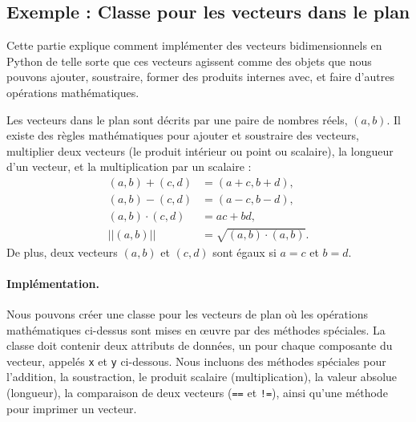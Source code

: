 \documentclass[%
oneside,                 %
final,                   %
10pt]{article}
\begin{document}
\noindent
\subsection{Exemple : Classe pour les vecteurs dans le plan}
Cette partie explique comment implémenter des vecteurs bidimensionnels en Python de telle sorte que ces vecteurs agissent comme des objets que nous pouvons ajouter, soustraire, former des produits internes avec, et faire d'autres opérations mathématiques.

Les vecteurs dans le plan sont décrits par une paire de nombres réels, $(a,b)$. Il existe des règles mathématiques pour ajouter et soustraire des vecteurs, multiplier deux vecteurs (le produit intérieur ou point ou scalaire), la longueur d'un vecteur, et la multiplication par un scalaire :
\begin{align}
(a,b) + (c,d) &= (a+c, b+d),\\
(a,b) - (c,d) &= (a-c, b-d),\\
(a,b)\cdot(c,d) &= ac + bd,\\
||(a,b)|| &= \sqrt{(a,b)\cdot(a,b)}.
\end{align}
De plus, deux vecteurs $(a,b)$ et $(c,d)$ sont égaux si $a=c$ et $b=d$.
\paragraph{Implémentation.}
Nous pouvons créer une classe pour les vecteurs de plan où les opérations mathématiques ci-dessus sont mises en œuvre par des méthodes spéciales. La classe doit contenir deux attributs de données, un pour chaque composante du vecteur, appelés \texttt{x} et \texttt{y} ci-dessous. Nous incluons des méthodes spéciales pour l'addition, la soustraction, le produit scalaire (multiplication), la valeur absolue (longueur), la comparaison de deux vecteurs (\texttt{==} et \Verb?!=?), ainsi qu'une méthode pour imprimer un vecteur.
\end{document}
